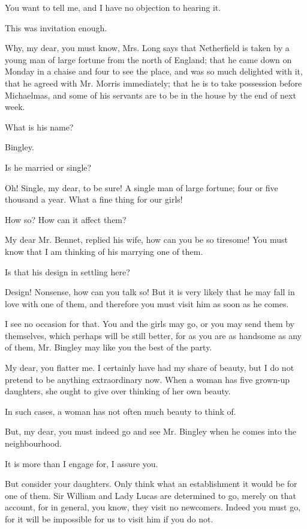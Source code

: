 \documentclass[twocolumn,DIV=7]{scrartcl}
\begin{document}
You want to tell me, and I have no objection to hearing it.

This was invitation enough.

Why, my dear, you must know, Mrs. Long says that Netherfield is taken
by a young man of large fortune from the north of England; that he came
down on Monday in a chaise and four to see the place, and was so much
delighted with it, that he agreed with Mr. Morris immediately; that he
is to take possession before Michaelmas, and some of his servants are to
be in the house by the end of next week.

What is his name?

Bingley.

Is he married or single?

Oh! Single, my dear, to be sure! A single man of large fortune; four or
five thousand a year. What a fine thing for our girls!

How so? How can it affect them?

My dear Mr. Bennet, replied his wife, how can you be so tiresome! You
must know that I am thinking of his marrying one of them.

Is that his design in settling here?

Design! Nonsense, how can you talk so! But it is very likely that he
may fall in love with one of them, and therefore you must visit him as
soon as he comes.

I see no occasion for that. You and the girls may go, or you may send
them by themselves, which perhaps will be still better, for as you are
as handsome as any of them, Mr. Bingley may like you the best of the
party.

My dear, you flatter me. I certainly have had my share of beauty, but
I do not pretend to be anything extraordinary now. When a woman has five
grown-up daughters, she ought to give over thinking of her own beauty.

In such cases, a woman has not often much beauty to think of.

But, my dear, you must indeed go and see Mr. Bingley when he comes into
the neighbourhood.

It is more than I engage for, I assure you.

But consider your daughters. Only think what an establishment it would
be for one of them. Sir William and Lady Lucas are determined to
go, merely on that account, for in general, you know, they visit no
newcomers. Indeed you must go, for it will be impossible for us to
visit him if you do not.
\end{document}
